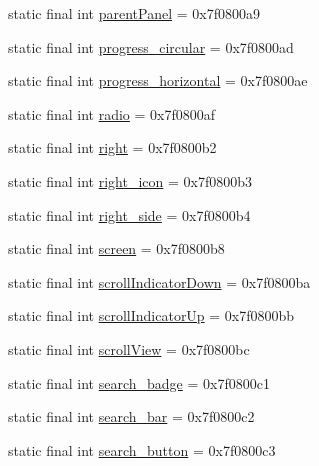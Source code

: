 \begin{DoxyCompactItemize}
static final int \mbox{\hyperlink{classcom_1_1synnapps_1_1carouselview_1_1_r_1_1id_a0ae75e2662375caed4eea6225bfab63c}{parent\+Panel}} = 0x7f0800a9
\item 
static final int \mbox{\hyperlink{classcom_1_1synnapps_1_1carouselview_1_1_r_1_1id_a2ed499393b7257372fa35ac8d432a5e4}{progress\+\_\+circular}} = 0x7f0800ad
\item 
static final int \mbox{\hyperlink{classcom_1_1synnapps_1_1carouselview_1_1_r_1_1id_af347af0824c085256c6a173dac35fa82}{progress\+\_\+horizontal}} = 0x7f0800ae
\item 
static final int \mbox{\hyperlink{classcom_1_1synnapps_1_1carouselview_1_1_r_1_1id_ad1f8a928ff6930f8186b92fbff0f2d51}{radio}} = 0x7f0800af
\item 
static final int \mbox{\hyperlink{classcom_1_1synnapps_1_1carouselview_1_1_r_1_1id_a8bd8da5fc8bb6760926d8e72e407e833}{right}} = 0x7f0800b2
\item 
static final int \mbox{\hyperlink{classcom_1_1synnapps_1_1carouselview_1_1_r_1_1id_a162e60aaae7c713b82e6021a425817e7}{right\+\_\+icon}} = 0x7f0800b3
\item 
static final int \mbox{\hyperlink{classcom_1_1synnapps_1_1carouselview_1_1_r_1_1id_a5bc4d07ec534b730059877b448e20194}{right\+\_\+side}} = 0x7f0800b4
\item 
static final int \mbox{\hyperlink{classcom_1_1synnapps_1_1carouselview_1_1_r_1_1id_a0ed25cfc7fcee06c4c18c08b20e16424}{screen}} = 0x7f0800b8
\item 
static final int \mbox{\hyperlink{classcom_1_1synnapps_1_1carouselview_1_1_r_1_1id_aabebbd918af2bd50b50e895a5c658b68}{scroll\+Indicator\+Down}} = 0x7f0800ba
\item 
static final int \mbox{\hyperlink{classcom_1_1synnapps_1_1carouselview_1_1_r_1_1id_a937975a1de74652b278c4ec42671b592}{scroll\+Indicator\+Up}} = 0x7f0800bb
\item 
static final int \mbox{\hyperlink{classcom_1_1synnapps_1_1carouselview_1_1_r_1_1id_a790a7016cdc814643d9b698ef2751967}{scroll\+View}} = 0x7f0800bc
\item 
static final int \mbox{\hyperlink{classcom_1_1synnapps_1_1carouselview_1_1_r_1_1id_aeae07fc3ab96ee77e780d153b1b75caf}{search\+\_\+badge}} = 0x7f0800c1
\item 
static final int \mbox{\hyperlink{classcom_1_1synnapps_1_1carouselview_1_1_r_1_1id_ae32fb0249398fbe28de78c3051569ed5}{search\+\_\+bar}} = 0x7f0800c2
\item 
static final int \mbox{\hyperlink{classcom_1_1synnapps_1_1carouselview_1_1_r_1_1id_a368ec3c6e2e7dfe400c0b431e2feb1bc}{search\+\_\+button}} = 0x7f0800c3

\end{DoxyCompactItemize}

